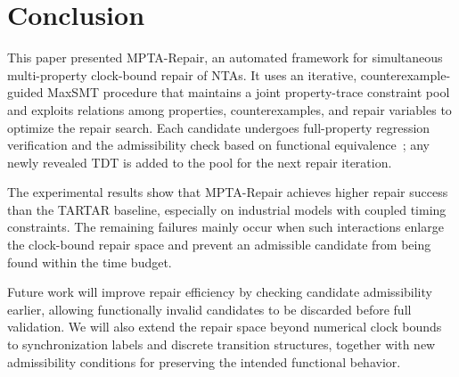 \section{Conclusion}
\label{sec:conclusion}

This paper presented MPTA-Repair, an automated framework for
simultaneous multi-property clock-bound repair of NTAs. It uses an
iterative, counterexample-guided MaxSMT procedure that maintains a joint
property-trace constraint pool and exploits relations among properties,
counterexamples, and repair variables to optimize the repair search.
Each candidate undergoes full-property regression verification and the
admissibility check based on functional equivalence~\cite{kolbl2019clock};
any newly revealed TDT is added to the pool for the next repair
iteration.

The experimental results show that MPTA-Repair achieves higher repair
success than the TARTAR baseline, especially on industrial models with
coupled timing constraints. The remaining failures mainly occur when
such interactions enlarge the clock-bound repair space and prevent an
admissible candidate from being found within the time budget.

Future work will improve repair efficiency by checking candidate
admissibility earlier, allowing functionally invalid candidates to be
discarded before full validation. We will also extend the repair space
beyond numerical clock bounds to synchronization labels and discrete
transition structures, together with new admissibility conditions for
preserving the intended functional behavior.
